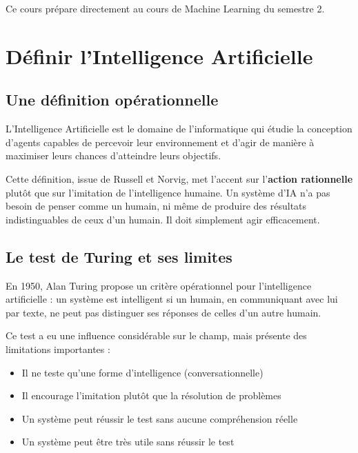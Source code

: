 \documentclass[11pt,a4paper]{article}
\begin{document}
Ce cours prépare directement au cours de Machine Learning du semestre 2.

\section{Définir l'Intelligence Artificielle}

\subsection{Une définition opérationnelle}

\begin{definitionbox}
L'Intelligence Artificielle est le domaine de l'informatique qui étudie la conception d'agents capables de percevoir leur environnement et d'agir de manière à maximiser leurs chances d'atteindre leurs objectifs.
\end{definitionbox}

Cette définition, issue de Russell et Norvig, met l'accent sur l'\textbf{action rationnelle} plutôt que sur l'imitation de l'intelligence humaine. Un système d'IA n'a pas besoin de penser comme un humain, ni même de produire des résultats indistinguables de ceux d'un humain. Il doit simplement agir efficacement.

\subsection{Le test de Turing et ses limites}

En 1950, Alan Turing propose un critère opérationnel pour l'intelligence artificielle : un système est intelligent si un humain, en communiquant avec lui par texte, ne peut pas distinguer ses réponses de celles d'un autre humain.

Ce test a eu une influence considérable sur le champ, mais présente des limitations importantes :
\begin{itemize}
    \item Il ne teste qu'une forme d'intelligence (conversationnelle)
    \item Il encourage l'imitation plutôt que la résolution de problèmes
    \item Un système peut réussir le test sans aucune compréhension réelle
    \item Un système peut être très utile sans réussir le test
\end{itemize}
\end{document}
